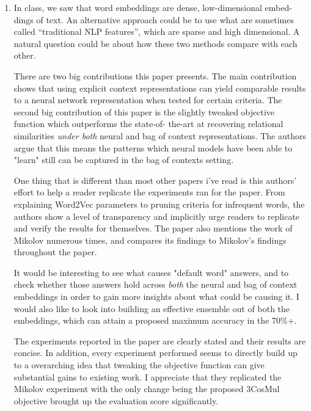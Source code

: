 \documentclass{article}
\begin{document}
\begin{enumerate}
\item In class, we saw that word embeddings are dense, low-dimensional embed- dings of text. An alternative approach could be to use what are sometimes called “traditional NLP features”, which are sparse and high dimensional. A natural question could be about how these two methods compare with each other.
\setlength{\parindent}{10ex}\par
There are two big contributions this paper presents. The main contribution shows that using explicit context representations can yield comparable results to a neural network representation when tested for certain criteria. The second big contribution of this paper is the slightly tweaked objective function which outperforms the state-of- the-art at recovering relational similarities \textit{under both} neural and bag of context representations. The authors argue that this means the patterns which neural models have been able to "learn" still can be captured in the bag of contexts setting. \par
One thing that is different than most other papers i've read is this authors' effort to help a reader replicate the experiments ran for the paper. From explaining Word2Vec parameters to pruning criteria for infrequent words, the authors show a level of transparency and implicitly urge readers to replicate and verify the results for themselves. The paper also mentions the work of Mikolov numerous times, and compares its findings to Mikolov's findings throughout the paper.  \par
It would be interesting to see what causes "default word" answers, and to check whether those answers hold across \textit{both} the neural and bag of context embeddings in order to gain more insights about what could be causing it. I would also like to look into building an effective ensemble out of both the embeddings, which can attain a proposed maximum accuracy in the 70\%+. \par
The experiments reported in the paper are clearly stated and their results are concise. In addition, every experiment performed seems to directly build up to a overarching idea that tweaking the objective function can give substantial gains to existing work. I appreciate that they replicated  the Mikolov experiment with the only change being the proposed 3CosMul objective brought up the evaluation score significantly. \par

\end{enumerate}
\end{document}

